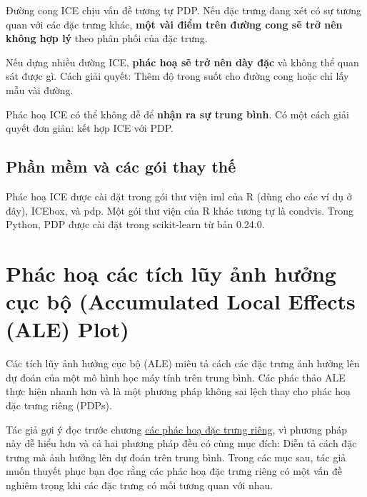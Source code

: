 Đường cong ICE chịu vấn đề tương tự PDP. Nếu đặc trưng đang xét có sự tương quan với các đặc trưng khác, \textbf{một vài điểm trên đường cong sẽ trở nên không hợp lý} theo phân phối của đặc trưng.

Nếu dựng nhiều đường ICE, \textbf{phác hoạ sẽ trở nên dày đặc} và không thể quan sát được gì. Cách giải quyết: Thêm độ trong suốt cho đường cong hoặc chỉ lấy mẫu vài đường.

Phác hoạ ICE có thể không dễ để \textbf{nhận ra sự trung bình}. Có một cách giải quyết đơn giản: kết hợp ICE với PDP.

\subsection{Phần mềm và các gói thay thế}
Phác hoạ ICE được cài đặt trong gói thư viện iml của R (dùng cho các ví dụ ở đây), ICEbox, và pdp. Một gói thư viện của R khác tương tự là condvis. Trong Python, PDP được cài đặt trong scikit-learn từ bản 0.24.0. 
\clearpage

\section{Phác hoạ các tích lũy ảnh hưởng cục bộ (Accumulated Local Effects (ALE) Plot)}\label{Chap_5.3}
Các tích lũy ảnh hưởng cục bộ (ALE) miêu tả cách các đặc trưng ảnh hưởng lên dự đoán của một mô hình học máy tính trên trung bình. Các phác thảo ALE thực hiện nhanh hơn và là một phương pháp không sai lệch thay cho phác hoạ đặc trưng riêng (PDPs).

Tác giả gợi ý đọc trước chương \href{Chapter_5.1}{các phác hoạ đặc trưng riêng}, vì phương pháp này dễ hiểu hơn và cả hai phương pháp đều có cùng mục đích: Diễn tả cách đặc trưng mà ảnh hưởng lên dự đoán trên trung bình. Trong các mục sau, tác giả muốn thuyết phục bạn đọc rằng các phác hoạ đặc trưng riêng có một vấn đề nghiêm trọng khi các đặc trưng có mối tương quan với nhau.

